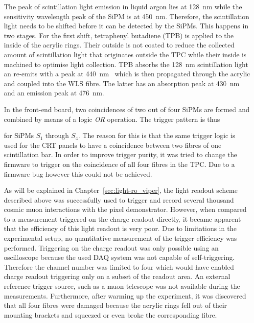 The peak of scintillation light emission in liquid argon lies at \SI{128}{\nano\metre} while the sensitivity wavelength peak of the SiPM is at \SI{450}{\nano\metre}.
Therefore, the scintillation light needs to be shifted before it can be detected by the SiPMs.
This happens in two stages.
For the first shift, tetraphenyl butadiene (TPB) is applied to the inside of the acrylic rings.
Their outside is not coated to reduce the collected amount of scintillation light that originates outside the TPC while their inside is machined to optimise light collection.
TPB absorbs the \SI{128}{\nano\metre} scintillation light an re-emits with a peak at \SI{440}{\nano\metre}~\cite{tpb} which is then propagated through the acrylic and coupled into the WLS fibre.
The latter has an absorption peak at \SI{430}{\nano\metre} and an emission peak at \SI{476}{\nano\metre}.

In the front-end board, two coincidences of two out of four SiPMs are formed and combined by means of a logic \emph{OR} operation.
The trigger pattern is thus
for SiPMs $S_1$ through $S_4$.
The reason for this is that the same trigger logic is used for the CRT panels to have a coincidence between two fibres of one scintillation bar.
In order to improve trigger purity, it was tried to change the firmware to trigger on the coincidence of all four fibres in the TPC.
Due to a firmware bug however this could not be achieved.

As will be explained in Chapter~\ref{sec:light-ro_viper}, the light readout scheme described above was successfully used to trigger and record several thousand cosmic muon interactions with the \AC{} pixel demonstrator.
However, when compared to a measurement triggered on the charge readout directly, it became apparent that the efficiency of this light readout is very poor.
Due to limitations in the experimental setup, no quantitative measurement of the trigger efficiency was performed.
Triggering on the charge readout was only possible using an oscilloscope because the used DAQ system was not capable of self-triggering.
Therefore the channel number was limited to four which would have enabled charge readout triggering only on a subset of the readout area.
An external reference trigger source, such as a muon telescope was not available during the measurements.
Furthermore, after warming up the experiment, it was discovered that all four fibres were damaged because the acrylic rings fell out of their mounting brackets and squeezed or even broke the corresponding fibre.

